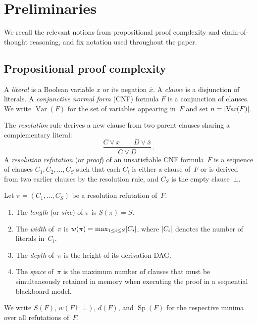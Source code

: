 \section{Preliminaries}\label{sec:prelim}

We recall the relevant notions from propositional proof complexity and
chain-of-thought reasoning, and fix notation used throughout the paper.

\subsection{Propositional proof complexity}\label{sec:prelim-proof}

A \emph{literal} is a Boolean variable $x$ or its negation $\bar{x}$.  A
\emph{clause} is a disjunction of literals.  A \emph{conjunctive normal form}
(CNF) formula $F$ is a conjunction of clauses.  We write $\operatorname{Var}(F)$
for the set of variables appearing in~$F$ and set $n = \lvert\operatorname{Var}(F)\rvert$.

\begin{definition}\label{def:resolution}
The \emph{resolution} rule derives a new clause from two parent clauses sharing
a complementary literal:
\[
\frac{C \vee x \qquad D \vee \bar{x}}{C \vee D}\,.
\]
A \emph{resolution refutation} (or \emph{proof}) of an unsatisfiable CNF
formula~$F$ is a sequence of clauses $C_1, C_2, \ldots, C_S$ such that each
$C_i$ is either a clause of~$F$ or is derived from two earlier clauses by the
resolution rule, and $C_S$ is the empty clause~$\bot$.
\end{definition}

\begin{definition}\label{def:complexity-measures}
Let $\pi = (C_1, \ldots, C_S)$ be a resolution refutation of~$F$.
\begin{enumerate}[label=(\roman*)]
\item The \emph{length} (or \emph{size}) of $\pi$ is $S(\pi) = S$.
\item The \emph{width} of~$\pi$ is
  $w(\pi) = \max_{1 \le i \le S} \lvert C_i\rvert$, where $\lvert C_i\rvert$ denotes the
  number of literals in~$C_i$.
\item The \emph{depth} of~$\pi$ is the height of its derivation DAG.
\item The \emph{space} of~$\pi$ is the maximum number of clauses that must be
  simultaneously retained in memory when executing the proof in a
  sequential blackboard model.
\end{enumerate}
We write $S(F)$, $w(F \vdash \bot)$, $d(F)$, and $\operatorname{Sp}(F)$ for
the respective minima over all refutations of~$F$.
\end{definition}

